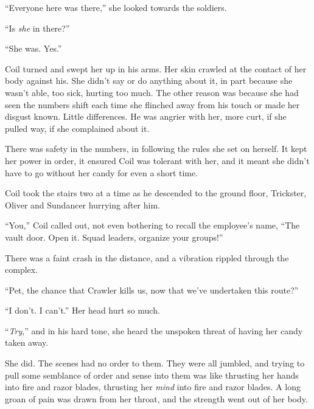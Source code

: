 ``Everyone here was there,'' she looked towards the soldiers.



``Is \emph{she} in there?''



``She was.  Yes.''



Coil turned and swept her up in his arms.  Her skin crawled at the contact of her body against his.  She didn't say or do anything about it, in part because she wasn't able, too sick, hurting too much.  The other reason was because she had seen the numbers shift each time she flinched away from his touch or made her disgust known.  Little differences.  He was angrier with her, more curt, if she pulled way, if she complained about it.



There was safety in the numbers, in following the rules she set on herself.  It kept her power in order, it ensured Coil was tolerant with her, and it meant she didn't have to go without her candy for even a short time.



Coil took the stairs two at a time as he descended to the ground floor, Trickster, Oliver and Sundancer hurrying after him.



``You,'' Coil called out, not even bothering to recall the employee's name, ``The vault door.  Open it.  Squad leaders, organize your groups!''



There was a faint crash in the distance, and a vibration rippled through the complex.



``Pet, the chance that Crawler kills us, now that we've undertaken this route?''



``I don't.  I can't.''  Her head hurt so much.



``\emph{Try},'' and in his hard tone, she heard the unspoken threat of having her candy taken away.



She did.  The scenes had no order to them.  They were all jumbled, and trying to pull some semblance of order and sense into them was like thrusting her hands into fire and razor blades, thrusting her \emph{mind} into fire and razor blades.  A long groan of pain was drawn from her throat, and the strength went out of her body.



